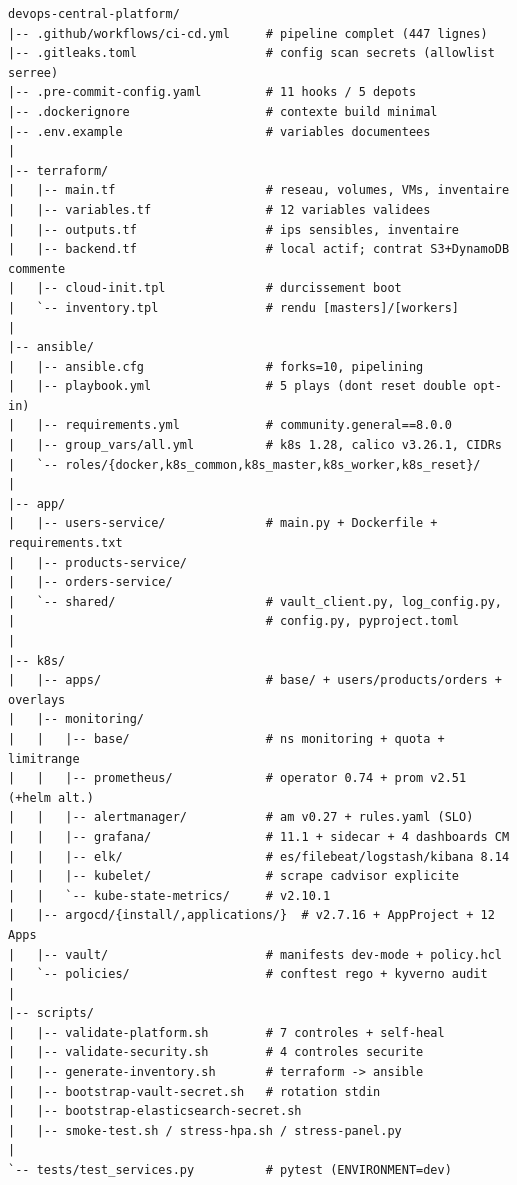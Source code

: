 \documentclass[12pt,a4paper]{article}
\begin{document}
\begin{lstlisting}[caption={Structure complete du projet (fichiers cles)}]
devops-central-platform/
|-- .github/workflows/ci-cd.yml     # pipeline complet (447 lignes)
|-- .gitleaks.toml                  # config scan secrets (allowlist serree)
|-- .pre-commit-config.yaml         # 11 hooks / 5 depots
|-- .dockerignore                   # contexte build minimal
|-- .env.example                    # variables documentees
|
|-- terraform/
|   |-- main.tf                     # reseau, volumes, VMs, inventaire
|   |-- variables.tf                # 12 variables validees
|   |-- outputs.tf                  # ips sensibles, inventaire
|   |-- backend.tf                  # local actif; contrat S3+DynamoDB commente
|   |-- cloud-init.tpl              # durcissement boot
|   `-- inventory.tpl               # rendu [masters]/[workers]
|
|-- ansible/
|   |-- ansible.cfg                 # forks=10, pipelining
|   |-- playbook.yml                # 5 plays (dont reset double opt-in)
|   |-- requirements.yml            # community.general==8.0.0
|   |-- group_vars/all.yml          # k8s 1.28, calico v3.26.1, CIDRs
|   `-- roles/{docker,k8s_common,k8s_master,k8s_worker,k8s_reset}/
|
|-- app/
|   |-- users-service/              # main.py + Dockerfile + requirements.txt
|   |-- products-service/
|   |-- orders-service/
|   `-- shared/                     # vault_client.py, log_config.py,
|                                   # config.py, pyproject.toml
|
|-- k8s/
|   |-- apps/                       # base/ + users/products/orders + overlays
|   |-- monitoring/
|   |   |-- base/                   # ns monitoring + quota + limitrange
|   |   |-- prometheus/             # operator 0.74 + prom v2.51 (+helm alt.)
|   |   |-- alertmanager/           # am v0.27 + rules.yaml (SLO)
|   |   |-- grafana/                # 11.1 + sidecar + 4 dashboards CM
|   |   |-- elk/                    # es/filebeat/logstash/kibana 8.14
|   |   |-- kubelet/                # scrape cadvisor explicite
|   |   `-- kube-state-metrics/     # v2.10.1
|   |-- argocd/{install/,applications/}  # v2.7.16 + AppProject + 12 Apps
|   |-- vault/                      # manifests dev-mode + policy.hcl
|   `-- policies/                   # conftest rego + kyverno audit
|
|-- scripts/
|   |-- validate-platform.sh        # 7 controles + self-heal
|   |-- validate-security.sh        # 4 controles securite
|   |-- generate-inventory.sh       # terraform -> ansible
|   |-- bootstrap-vault-secret.sh   # rotation stdin
|   |-- bootstrap-elasticsearch-secret.sh
|   |-- smoke-test.sh / stress-hpa.sh / stress-panel.py
|
`-- tests/test_services.py          # pytest (ENVIRONMENT=dev)
\end{lstlisting}
\end{document}
